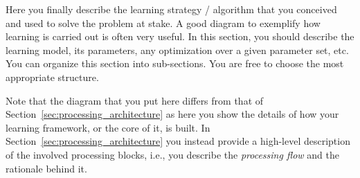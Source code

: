 Here you finally describe the learning strategy / algorithm that you conceived and used to solve the problem at stake. A good diagram to exemplify how learning is carried out is often very useful. In this section, you should describe the learning model, its parameters, any optimization over a given parameter set, etc. You can organize this section into \mbox{sub-sections}. You are free to choose the most appropriate structure.

\begin{remark}
Note that the diagram that you put here differs from that of Section~\ref{sec:processing_architecture} as here you show the details of how your learning framework, or the core of it, is built. In Section~\ref{sec:processing_architecture} you instead provide a high-level description of the involved processing blocks, i.e., you describe the {\it processing flow} and the rationale behind it.
\end{remark}

